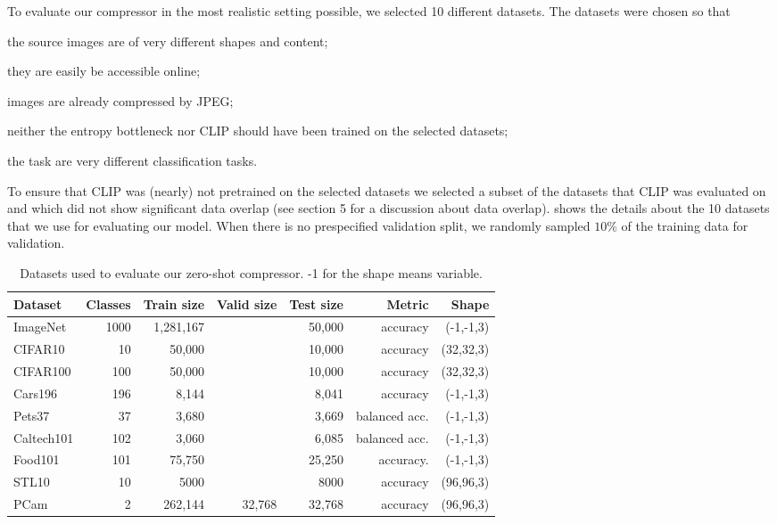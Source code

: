 \documentclass[final]{article}
\begin{document}
To evaluate our compressor in the most realistic setting possible, we selected 10 different datasets.
The datasets were chosen so that
\begin{inlinelist}
\item the source images are of very different shapes and content;
\item they are easily be accessible online;
\item images are already compressed by JPEG;
\item neither the entropy bottleneck nor CLIP should have been trained on the selected datasets;
\item the task are very different classification tasks.
\end{inlinelist}
To ensure that CLIP was (nearly) not pretrained on the selected datasets we selected a subset of the datasets that CLIP was evaluated on and which did not show significant data overlap (see  section 5 for a discussion about data overlap).
 shows the details about the 10 datasets that we use for evaluating our model.
When there is no prespecified validation split, we randomly sampled $10\%$ of the training data for validation.

\begin{table}[h]
\caption{
Datasets used to evaluate our zero-shot compressor. -1 for the shape means variable. 
}
\begin{center}
\begin{tabular}{lrrrrrr}
\toprule
Dataset & Classes  & Train size & Valid size & Test size & Metric & Shape   \\ 
\midrule 
ImageNet \cite{deng_imagenet_2009} & 1000 &  1,281,167 &    & 50,000 & accuracy & (-1,-1,3) \\
CIFAR10 \cite{krizhevsky_learning_2009} & 10 & 50,000 & & 10,000 & accuracy & (32,32,3) \\
CIFAR100 \cite{krizhevsky_learning_2009} & 100 & 50,000 & & 10,000 & accuracy & (32,32,3) \\
Cars196 \cite{krause_3d_2013} & 196 & 8,144 &  & 8,041 & accuracy & (-1,-1,3) \\
Pets37 \cite{parkhi_cats_2012} & 37 & 3,680 &  &  3,669 & balanced acc. & (-1,-1,3) \\
Caltech101 \cite{li_learning_2007} & 102 & 3,060 & & 6,085 & balanced acc. & (-1,-1,3) \\
Food101 \cite{nilsback_automated_2008} & 101 & 75,750 &   & 25,250 & accuracy. & (-1,-1,3) \\
STL10 \cite{coates_analysis_2011} & 10 &  5000 & &  8000 & accuracy & (96,96,3) \\
PCam \cite{veeling_rotation_2018,ehteshami_bejnordi_diagnostic_2017} & 2 &  262,144 & 32,768 & 32,768 & accuracy & (96,96,3)  \\
\bottomrule
\end{tabular}
\end{center}
\label{table:clip_data}
\end{table}
 
\end{document}
